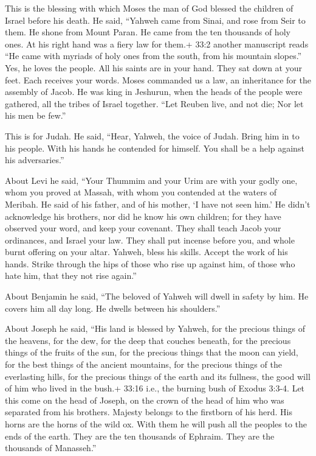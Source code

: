  This is the blessing with which Moses the man of God
blessed the children of Israel before his death.  He said,
``Yahweh came from Sinai, and rose from Seir to them. He shone from
Mount Paran. He came from the ten thousands of holy ones. At his right
hand was a fiery law for them.+ 33:2 another manuscript reads ``He came
with myriads of holy ones from the south, from his mountain slopes.''
 Yes, he loves the people. All his saints are in your hand.
They sat down at your feet. Each receives your words.  Moses
commanded us a law, an inheritance for the assembly of Jacob.
 He was king in Jeshurun, when the heads of the people were
gathered, all the tribes of Israel together.  ``Let Reuben
live, and not die; Nor let his men be few.''

 This is for Judah. He said, ``Hear, Yahweh, the voice of
Judah. Bring him in to his people. With his hands he contended for
himself. You shall be a help against his adversaries.''

 About Levi he said, ``Your Thummim and your Urim are with
your godly one, whom you proved at Massah, with whom you contended at
the waters of Meribah.  He said of his father, and of his
mother, `I have not seen him.' He didn't acknowledge his brothers, nor
did he know his own children; for they have observed your word, and keep
your covenant.  They shall teach Jacob your ordinances, and
Israel your law. They shall put incense before you, and whole burnt
offering on your altar.  Yahweh, bless his skills. Accept
the work of his hands. Strike through the hips of those who rise up
against him, of those who hate him, that they not rise again.''

 About Benjamin he said, ``The beloved of Yahweh will dwell
in safety by him. He covers him all day long. He dwells between his
shoulders.''

 About Joseph he said, ``His land is blessed by Yahweh, for
the precious things of the heavens, for the dew, for the deep that
couches beneath,  for the precious things of the fruits of
the sun, for the precious things that the moon can yield, 
for the best things of the ancient mountains, for the precious things of
the everlasting hills,  for the precious things of the
earth and its fullness, the good will of him who lived in the bush.+
33:16 i.e., the burning bush of Exodus 3:3-4. Let this come on the head
of Joseph, on the crown of the head of him who was separated from his
brothers.  Majesty belongs to the firstborn of his herd.
His horns are the horns of the wild ox. With them he will push all the
peoples to the ends of the earth. They are the ten thousands of Ephraim.
They are the thousands of Manasseh.''

